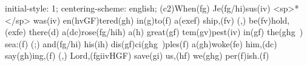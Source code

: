 initial-style: 1;
centering-scheme: english;
(c2)When(fg) Je(fg/hi)sus(iv) <sp>*</sp> was(iv) en(hvGF)tered(gh) in(g)to(f) a(exef) ship,(fv) (,) be(fv)hold,(exfe) there(d) a(dc)rose(fg/hih) a(h) great(gf) tem(gv)pest(iv) in(gf) the(ghg~) sea:(f) (;) and(fg/hi) his(ih) dis(gf)ci(ghg~)ples(f) a(gh)woke(fe) him,(dc) say(gh)ing,(f) (,) Lord,(fgiivHGF) save(gi) us,(hf) we(ghg) per(f)ish.(f)
